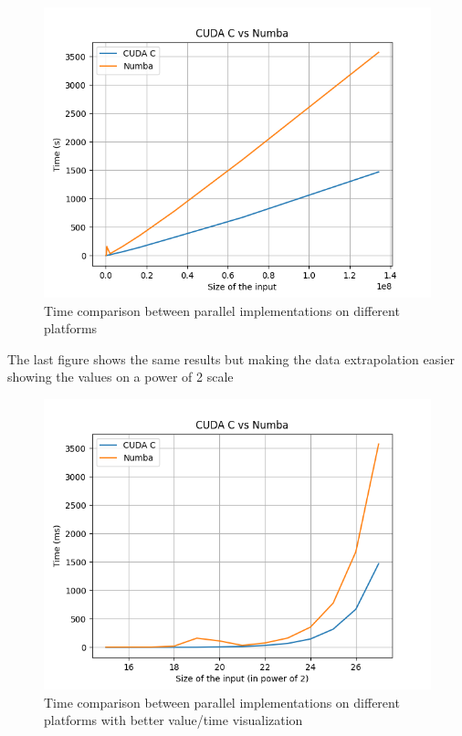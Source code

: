 \documentclass[a4paper, 12pt, oneside]{article}
\begin{document}
\begin{figure}[H]
  \includegraphics[width=400pt]{images/cpp_vs_py_2.png}
  \caption{Time comparison between parallel implementations on different platforms}
\end{figure}

The last figure shows the same results but making the data extrapolation easier showing the values on a power of 2 scale

\begin{figure}[H]
  \includegraphics[width=400pt]{images/cpp_vs_py.png}
  \caption{Time comparison between parallel implementations on different platforms with better value/time visualization}
\end{figure}
\end{document}
